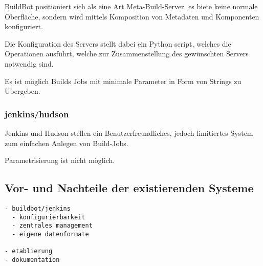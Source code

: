 BuildBot positioniert sich als eine Art Meta-Build-Server.
es biete keine normale Oberfläche, sondern wird mittels
Komposition von Metadaten und Komponenten konfiguriert.

Die Konfiguration des Servers stellt dabei ein Python script,
welches die Operationen ausführt, welche zur Zusammenstellung des gewünschten Servers notwendig sind.

Es ist möglich Builds Jobs mit minimale Parameter in Form von Strings zu Übergeben.

\subsubsection{jenkins/hudson}

Jenkins und Hudson stellen ein Benutzerfreundliches,
jedoch limitiertes System zum einfachen Anlegen von Build-Jobs.

Parametrisierung ist nicht möglich.

\subsection{Vor- und Nachteile der existierenden Systeme}

\begin{verbatim}
- buildbot/jenkins
  - konfigurierbarkeit
  - zentrales management
  - eigene datenformate

- etablierung
- dokumentation
\end{verbatim}


